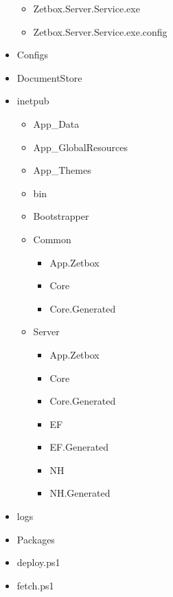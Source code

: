 \begin{itemize}
{\begin{itemize}
{\begin{itemize}
{\begin{itemize}
  	  	  	  	  \item Core.Generated
  	  	  	  	  \item EF
  	  	  	  	  \item EF.Generated
  	  	  	  	  \item NH
  	  	  	  	  \item NH.Generated
  	  	  	  	 \end{itemize}
  	  	  	  }
  	  	  	  \item Zetbox.Server.Service.exe
  	  	  	  \item Zetbox.Server.Service.exe.config
  	  	  	\end{itemize}  
  		}
  	  	\end{itemize}
  	  }
  	  \item Configs
  	  \item DocumentStore
  	  \item { inetpub
  	  	\begin{itemize} 
  	  	  \item App\_Data
  	  	  \item App\_GlobalResources
  	  	  \item App\_Themes
  	  	  \item bin
  	  	  \item Bootstrapper
  	  	  \item { Common
  	  	  	\begin{itemize}
  	  	  	  \item App.Zetbox
  	  	  	  \item Core
  	  	  	  \item Core.Generated
  	  	  	 \end{itemize}
  	  	  }
  	  	  \item { Server
  	  	  	\begin{itemize}
  	  	  	  \item App.Zetbox
  	  	  	  \item Core
  	  	  	  \item Core.Generated
  	  	  	  \item EF
  	  	  	  \item EF.Generated
  	  	  	  \item NH
  	  	  	  \item NH.Generated
  	  	  	 \end{itemize}
  	  	  }
  	  	  \end{itemize} 
  	  }
  	  \item logs
  	  \item Packages
  	  \item deploy.ps1
  	  \item fetch.ps1
  	\end{itemize} 

